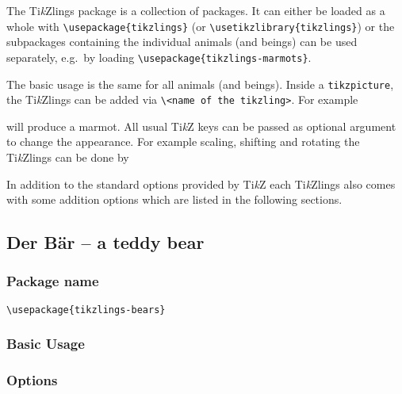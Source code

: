 \documentclass[parskip=half]{scrartcl}
\newcommand{\TikZ}{Ti\emph{k}Z\xspace}
\newcommand{\tikzlings}{Ti\emph{k}Zlings\xspace}
\begin{document}
The \tikzlings package is a collection of packages. It can either be loaded as a whole with \lstinline|\usepackage{tikzlings}| (or \lstinline|\usetikzlibrary{tikzlings}|) or the subpackages containing the individual animals (and beings) can be used separately, e.g.\ by loading \lstinline|\usepackage{tikzlings-marmots}|.

The basic usage is the same for all animals (and beings). Inside a \lstinline|tikzpicture|, the \tikzlings can be added via \lstinline|\<name of the tikzling>|. For example

\begin{tcblisting}{}
\marmot
\end{tcblisting}

will produce a marmot. All usual \TikZ keys can be passed as optional argument to change the appearance. For example scaling, shifting and rotating the \tikzlings can be done by

\begin{tcblisting}{}
\coati[rotate=30,scale=0.7,xshift=0.1cm]
\end{tcblisting}

In addition to the standard options provided by \TikZ each \tikzlings also comes with some addition options which are listed in the following sections.

\subsection{Der B\"ar -- a teddy bear}

\subsubsection{Package name}

\begin{tcolorbox}
\vspace*{0.5cm}
\lstinline|\usepackage{tikzlings-bears}|
\vspace*{0.5cm}
\end{tcolorbox}

\subsubsection{Basic Usage}

\begin{tcblisting}{}
\bear
\end{tcblisting}

\subsubsection{Options}
\end{document}
